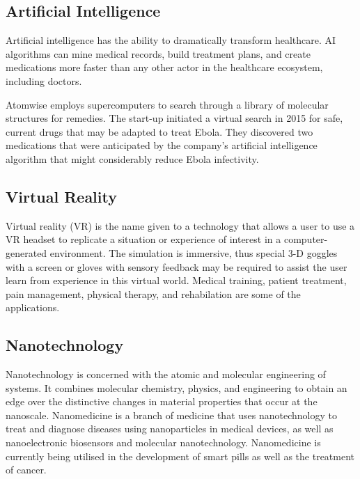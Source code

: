 \documentclass[12 pt]{article}
\begin{document}
\subsection{Artificial Intelligence}

Artificial intelligence has the ability to dramatically transform healthcare. AI algorithms can mine medical records, build treatment plans, and create medications more faster than any other actor in the healthcare ecosystem, including doctors.

Atomwise employs supercomputers to search through a library of molecular structures for remedies. The start-up initiated a virtual search in 2015 for safe, current drugs that may be adapted to treat Ebola. They discovered two medications that were anticipated by the company's artificial intelligence algorithm that might considerably reduce Ebola infectivity.





\subsection{Virtual Reality}
Virtual reality (VR) is the name given to a technology that allows a user to use a VR headset to replicate a situation or experience of interest in a computer-generated environment. The simulation is immersive, thus special 3-D goggles with a screen or gloves with sensory feedback may be required to assist the user learn from experience in this virtual world. Medical training, patient treatment, pain management, physical therapy, and rehabilation are some of the applications.



\subsection{Nanotechnology}
Nanotechnology is concerned with the atomic and molecular engineering of systems. It combines molecular chemistry, physics, and engineering to obtain an edge over the distinctive changes in material properties that occur at the nanoscale.
Nanomedicine is a branch of medicine that uses nanotechnology to treat and diagnose diseases using nanoparticles in medical devices, as well as nanoelectronic biosensors and molecular nanotechnology. Nanomedicine is currently being utilised in the development of smart pills as well as the treatment of cancer.
\end{document}
